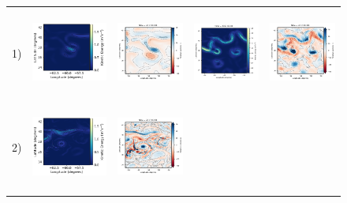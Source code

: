 \documentclass[draft]{agujournal2019}
\begin{document}
\begin{figure}[H]
\begin{center}
\begin{tabular}{ccccc}
\hspace{-10mm}  1)&
\includegraphics[trim={0 16mm 26mm 5mm},clip, width=3.3cm,height=2.9cm]{figures/plots2/orca025_train_ke.png} &
 \includegraphics[trim={13mm 13mm 22mm 6mm},clip, width=2.9cm,height=2.9cm]{figures/plots/orca025_train_vort_r.png} &
 \includegraphics[trim={13mm 13mm 22mm 6mm},clip, width=2.9cm,height=2.9cm]{figures/plots/orca025_rec_ke.png} &
 \includegraphics[trim={13mm 13mm 22mm 6mm},clip,width=2.9cm,height=2.9cm]{figures/plots/orca025_rec_vort_r.png} \\
\hspace{-10mm} 2) &
 \includegraphics[trim={0 16mm 26mm 5mm},clip, width=3.3cm,height=2.9cm]{figures/plots2/glorys12-f_train_ke.png} &
 \includegraphics[trim={13mm 13mm 22mm 6mm},clip, width=2.9cm,height=2.9cm]{figures/plots/glorys12-f_train_vort_r.png} &

\end{tabular}
\end{center}
\end{figure}
\end{document}
